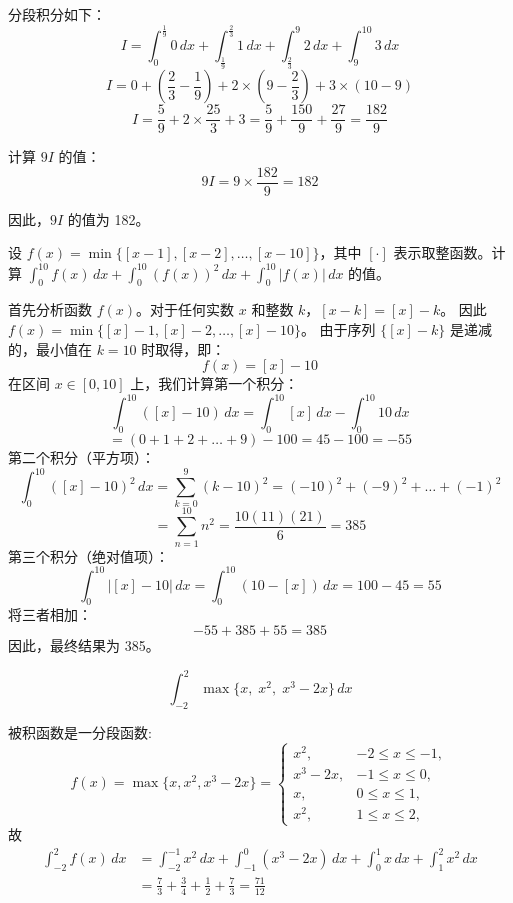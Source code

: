 \begin{questions}
\begin{solution}
分段积分如下：
\[ I = \int_{0}^{\frac{1}{9}} 0 \,dx + \int_{\frac{1}{9}}^{\frac{2}{3}} 1 \,dx + \int_{\frac{2}{3}}^{9} 2 \,dx + \int_{9}^{10} 3 \,dx \]
\[ I = 0 + \left( \frac{2}{3} - \frac{1}{9} \right) + 2 \times \left( 9 - \frac{2}{3} \right) + 3 \times (10 - 9) \]
\[ I = \frac{5}{9} + 2 \times \frac{25}{3} + 3 = \frac{5}{9} + \frac{150}{9} + \frac{27}{9} = \frac{182}{9} \]

计算 $9I$ 的值：
\[ 9I = 9 \times \frac{182}{9} = 182 \]

因此，$9I$ 的值为 182。
\end{solution}

\question
设 $f(x) = \min\{[x - 1], [x - 2], \dots, [x - 10]\}$，其中 $[\cdot]$ 表示取整函数。计算 $\int_{0}^{10} f(x) \, dx + \int_{0}^{10} (f(x))^2 \, dx + \int_{0}^{10} |f(x)| \, dx$ 的值。

\begin{solution}
首先分析函数 $f(x)$。对于任何实数 $x$ 和整数 $k$，$[x - k] = [x] - k$。
因此 $f(x) = \min\{[x]-1, [x]-2, \dots, [x]-10\}$。
由于序列 $\{[x]-k\}$ 是递减的，最小值在 $k=10$ 时取得，即：
\[
f(x) = [x] - 10
\]
在区间 $x \in [0, 10]$ 上，我们计算第一个积分：
\[
\int_{0}^{10} ([x] - 10) \, dx = \int_{0}^{10} [x] \, dx - \int_{0}^{10} 10 \, dx
\]
\[
= (0+1+2+\dots+9) - 100 = 45 - 100 = -55
\]
第二个积分（平方项）：
\[
\int_{0}^{10} ([x] - 10)^2 \, dx = \sum_{k=0}^{9} (k - 10)^2 = (-10)^2 + (-9)^2 + \dots + (-1)^2
\]
\[
= \sum_{n=1}^{10} n^2 = \frac{10(11)(21)}{6} = 385
\]
第三个积分（绝对值项）：
\[
\int_{0}^{10} |[x] - 10| \, dx = \int_{0}^{10} (10 - [x]) \, dx = 100 - 45 = 55
\]
将三者相加：
\[
-55 + 385 + 55 = 385
\]
因此，最终结果为 385。
\end{solution}

    \question 
    \[
    \int_{-2}^{2} \max\{x,\;x^{2},\;x^{3}-2x\}\,dx
    \]
    \begin{solution}
        被积函数是一分段函数:
        \[
        f(x)=\max\{x,x^2,x^3-2x\}=
        \begin{cases}
        x^2,&-2\le x\le -1,\\
        x^3-2x, &-1\le x\le 0,\\
        x, &0\le x\le 1,\\
        x^2,& 1\le x\le 2,
        \end{cases}
        \]
        故
        \begin{align*}
        \int_{-2}^2 f(x)\,dx 
        &= \int_{-2}^{-1} x^2\,dx + \int_{-1}^0 (x^3-2x)\,dx +\int_0^1x\,dx +\int_1^2 x^2\,dx \\
        &= \frac{7}{3}+\frac{3}{4}+\frac{1}{2} +\frac{7}{3} =\frac{71}{12}
        \end{align*}
    \end{solution}


\end{questions}
